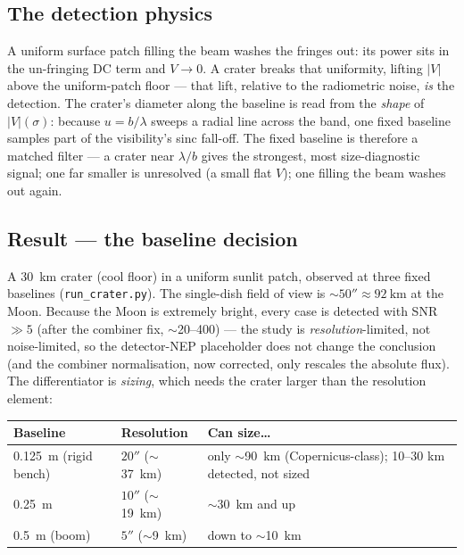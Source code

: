 \documentclass[11pt]{article}
\newcommand{\code}[1]{\texttt{\small #1}}
\begin{document}
\subsection{The detection physics}

\begin{physicsbox}
A uniform surface patch filling the beam washes the fringes out: its power
sits in the un-fringing DC term and $V\to0$. A crater breaks that uniformity,
lifting $|V|$ above the uniform-patch floor --- that lift, relative to the
radiometric noise, \emph{is} the detection. The crater's diameter along the
baseline is read from the \emph{shape} of $|V|(\sigma)$: because $u=b/\lambda$
sweeps a radial line across the band, one fixed baseline samples part of the
visibility's sinc fall-off. The fixed baseline is therefore a matched filter
--- a crater near $\lambda/b$ gives the strongest, most size-diagnostic
signal; one far smaller is unresolved (a small flat $V$); one filling the
beam washes out again.
\end{physicsbox}

\subsection{Result --- the baseline decision}

A \SI{30}{\kilo\metre} crater (cool floor) in a uniform sunlit patch, observed
at three fixed baselines (\code{run\_crater.py}). The single-dish field of
view is $\sim50''\approx\SI{92}{\kilo\metre}$ at the Moon. Because the Moon is
extremely bright, every case is detected with SNR $\gg5$ (after the combiner
fix, $\sim$20--400) --- the study is \emph{resolution}-limited, not
noise-limited, so the detector-NEP placeholder does not change the
conclusion (and the combiner normalisation, now corrected, only rescales the
absolute flux). The differentiator is \emph{sizing}, which needs the crater
larger than the resolution element:

\begin{center}\small
\begin{tabular}{@{}lll@{}}
\toprule
\textbf{Baseline} & \textbf{Resolution} & \textbf{Can size\ldots}\\
\midrule
\SI{0.125}{\metre} (rigid bench) & $20''$ ($\sim$\SI{37}{\kilo\metre}) &
only $\sim$\SI{90}{\kilo\metre} (Copernicus-class); 10--30 km detected, not sized\\
\SI{0.25}{\metre} & $10''$ ($\sim$\SI{19}{\kilo\metre}) & $\sim$\SI{30}{\kilo\metre} and up\\
\SI{0.5}{\metre} (boom) & $5''$ ($\sim$\SI{9}{\kilo\metre}) & down to $\sim$\SI{10}{\kilo\metre}\\
\bottomrule
\end{tabular}
\end{center}
\end{document}
